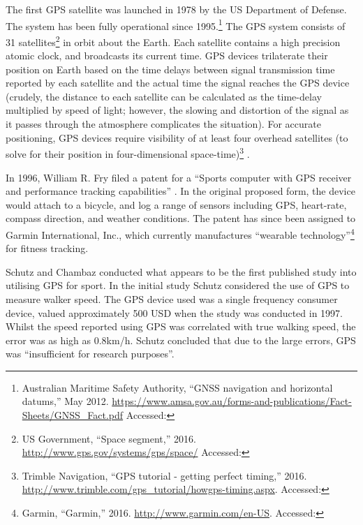 The first GPS satellite was launched in 1978 by the US Department of
Defense. The system has been fully operational since 1995.\footnote{Australian
  Maritime Safety Authority, ``GNSS navigation and horizontal datums,''
  May 2012.
  \url{https://www.amsa.gov.au/forms-and-publications/Fact-Sheets/GNSS_Fact.pdf}
  Accessed: } The GPS system consists of 31
satellites\footnote{US Government, ``Space segment,'' 2016.
  \url{http://www.gps.gov/systems/gps/space/} Accessed: } in
orbit about the Earth. Each satellite contains a high precision atomic
clock, and broadcasts its current time. GPS devices trilaterate %
their position on Earth based on the time delays between signal transmission
time reported by each satellite and the actual time the signal reaches
the GPS device (crudely, the distance to each satellite can be
calculated as the time-delay multiplied by speed of light; however, the
slowing and distortion of the signal as it passes through the atmosphere
complicates the situation). For accurate positioning, GPS devices
require visibility of at least four overhead satellites (to
solve for their position in four-dimensional space-time)\footnote{Trimble
  Navigation, ``GPS tutorial - getting perfect timing,'' 2016.
  \url{http://www.trimble.com/gps_tutorial/howgps-timing.aspx}.
  Accessed: } \cite{Navstar1996}.

In 1996, William R. Fry filed a patent for a ``Sports computer with GPS
receiver and performance tracking capabilities''
\cite{fry_sports_2000}. In the original proposed form, the device
would attach to a bicycle, and log a range of sensors including GPS,
heart-rate, compass direction, and weather conditions. The patent has
since been assigned to Garmin International, Inc., which currently
manufactures ``wearable technology''\footnote{Garmin, ``Garmin,'' 2016.
  \url{http://www.garmin.com/en-US}. Accessed: } for fitness
tracking.

Schutz and Chambaz \cite{schutz_short_1997} conducted what appears to be the
first \cite{Cummins2013} published study into utilising GPS
for sport. In the initial study Schutz considered the use of GPS to
measure walker speed. The GPS device used was a single frequency
consumer device, valued approximately 500 USD when the study was
conducted in 1997. Whilst the speed reported using GPS was correlated
with true walking speed, the error was as high as 0.8\thinspace km/h.
Schutz concluded that due to the large errors, GPS was ``insufficient
for research purposes''.

